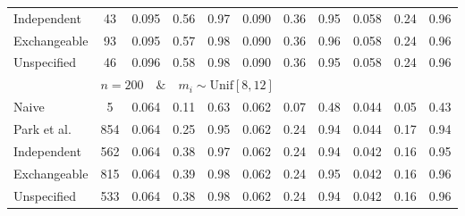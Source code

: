 \documentclass[submit]{smj}
\begin{document}
\begin{table}
\begin{adjustbox}{width=\textwidth}
\begin{tabular}{l|cccccccccc}
		Independent & 43& 0.095 & 0.56 & 0.97 & 0.090 & 0.36 & 0.95 & 0.058 & 0.24 & 0.96 \\ 
		Exchangeable & 93& 0.095 & 0.57 & 0.98 & 0.090 & 0.36 & 0.96 & 0.058 & 0.24 & 0.96 \\ 
		Unspecified & 46& 0.096 & 0.58 & 0.98 & 0.090 & 0.36 & 0.95 & 0.058 & 0.24 & 0.96 \\ 
		& \multicolumn{10}{l}{$n=200 \quad\& \quad m_i \sim  \text{Unif}[8,12]$}\\
		Naive& 5& 0.064 & 0.11 & 0.63 & 0.062 & 0.07 & 0.48 & 0.044 & 0.05 & 0.43 \\ 
		Park et al.& 854& 0.064 & 0.25 & 0.95 & 0.062 & 0.24 & 0.94 & 0.044 & 0.17 & 0.94 \\ 
		Independent & 562 & 0.064 & 0.38 & 0.97 & 0.062 & 0.24 & 0.94 & 0.042 & 0.16 & 0.95 \\ 
		Exchangeable & 815 & 0.064 & 0.39 & 0.98 & 0.062 & 0.24 & 0.95 & 0.042 & 0.16 & 0.96 \\
		Unspecified & 533 & 0.064 & 0.38 & 0.98 & 0.062 & 0.24 & 0.94 & 0.042 & 0.16 & 0.96 \\ 
		\hline
	\end{tabular}
\end{adjustbox}
\end{table}
\end{document}
